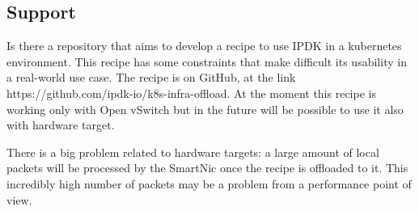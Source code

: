 \documentclass[../sn.tex]{subfiles}
\begin{document}
\subsection{Support}
Is there a repository that aims to develop a recipe to use IPDK in a kubernetes environment.
This recipe has some constraints that make difficult its usability in a real-world use case.
The recipe is on GitHub, at the link https://github.com/ipdk-io/k8s-infra-offload.
At the moment this recipe is working only with Open vSwitch but in the future will be possible to use it also with hardware target.

There is a big problem related to hardware targets: a large amount of local packets will be processed by the SmartNic once the recipe is offloaded to it. This incredibly high number of packets may be a problem from a performance point of view.
\end{document}
